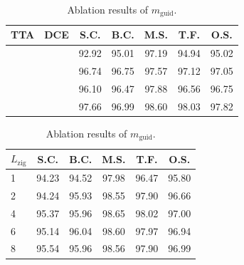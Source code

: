 \documentclass{llmxive}
\begin{document}
\begin{table}[t]
\centering
\begin{minipage}[t]{0.35\linewidth} 
    \centering
    \fontsize{8.5pt}{12pt}\selectfont
    \setlength{\tabcolsep}{3pt}
    \begin{tabular}{ccccccc}
    \toprule
    \textbf{TTA} & \textbf{DCE} & \textbf{S.C.} & \textbf{B.C.} & \textbf{M.S.} & \textbf{T.F.} & \textbf{O.S.} \\
    \midrule
      &           & 92.92 & 95.01 & 97.19 & 94.94 & 95.02 \\
     &           & 96.74 & 96.75 & 97.57 & 97.12 & 97.05 \\
              &  & 96.10 & 96.47 & 97.88 & 96.56 & 96.75 \\
     &  & 97.66 & 96.99 & 98.60 & 98.03 & 97.82 \\
    \bottomrule
    \end{tabular}
\end{minipage}
\hspace{0.02\linewidth}
\begin{minipage}[t]{0.29\linewidth} 
    \centering
    \fontsize{8.5pt}{12pt}\selectfont
    \caption{Ablation results of $L_{\mathrm{zig}}$.}
    \label{tab:ab_zig_length}
    \setlength{\tabcolsep}{3pt}
    \begin{tabular}{lccccc} 
        \toprule
        \textbf{$L_{\mathrm{zig}}$} & \textbf{S.C.} & \textbf{B.C.} & \textbf{M.S.} & \textbf{T.F.} & \textbf{O.S.} \\
        \midrule
        1 & 94.23 & 94.52 & 97.98 & 96.47 & 95.80 \\
        2 & 94.24 & 95.93 & 98.55 & 97.90 & 96.66 \\
        4 & 95.37 & 95.96 & 98.65 & 98.02 & 97.00 \\
        6 & 95.14 & 96.04 & 98.60 & 97.97 & 96.94 \\
        8 & 95.54 & 95.96 & 98.56 & 97.90 & 96.99 \\
        \bottomrule
    \end{tabular}
\end{minipage}
\hspace{0.02\linewidth}
\begin{minipage}[t]{0.29\linewidth} 
    \centering
    \fontsize{8.5pt}{12pt}\selectfont
    \caption{Ablation results of $m_{\mathrm{guid}}$.}

\end{minipage}
\end{table}
\end{document}
